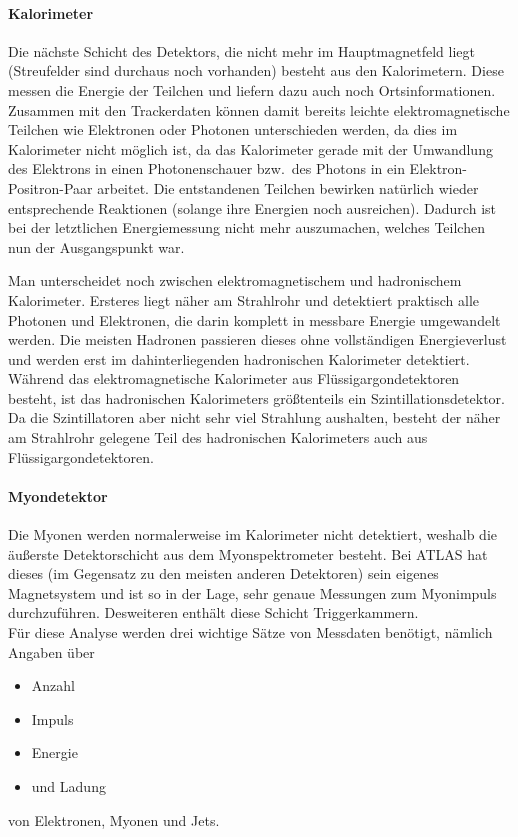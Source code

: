 \paragraph{Kalorimeter}
\label{cha:kalorimeter}
Die nächste Schicht des Detektors, die nicht mehr im Hauptmagnetfeld liegt
(Streufelder sind durchaus noch vorhanden) besteht aus den Kalorimetern. Diese
messen die Energie der Teilchen und liefern dazu auch noch Ortsinformationen.
Zusammen mit den Trackerdaten können damit bereits leichte elektromagnetische
Teilchen wie Elektronen oder Photonen unterschieden werden, da dies im
Kalorimeter nicht möglich ist, da das Kalorimeter gerade mit der Umwandlung des
Elektrons in einen Photonenschauer bzw.\ des Photons in ein
Elektron-Positron-Paar arbeitet. Die entstandenen Teilchen bewirken natürlich
wieder entsprechende Reaktionen (solange ihre Energien noch ausreichen). Dadurch
ist bei der letztlichen Energiemessung nicht mehr auszumachen, welches Teilchen
nun der Ausgangspunkt war.

Man unterscheidet noch zwischen elektromagnetischem und hadronischem
Kalorimeter. Ersteres liegt näher am Strahlrohr und detektiert praktisch alle
Photonen und Elektronen, die darin komplett in messbare Energie umgewandelt
werden. Die meisten Hadronen passieren dieses ohne vollständigen Energieverlust
und werden erst im dahinterliegenden hadronischen Kalorimeter detektiert.
Während das elektromagnetische Kalorimeter aus Flüssigargondetektoren besteht,
ist das hadronischen Kalorimeters größtenteils ein Szintillationsdetektor. Da
die Szintillatoren aber nicht sehr viel Strahlung aushalten, besteht der näher
am Strahlrohr gelegene Teil des hadronischen Kalorimeters auch aus
Flüssigargondetektoren.

\paragraph{Myondetektor}
Die Myonen werden normalerweise im Kalorimeter nicht detektiert, weshalb die
äußerste Detektorschicht aus dem Myonspektrometer besteht. Bei ATLAS hat dieses (im
Gegensatz zu den meisten anderen Detektoren) sein eigenes Magnetsystem und ist
so in der Lage, sehr genaue Messungen zum Myonimpuls durchzuführen. Desweiteren
enthält diese Schicht Triggerkammern.
\\

Für diese Analyse werden drei wichtige Sätze von Messdaten benötigt, nämlich
Angaben über 
\begin{itemize}
  \item Anzahl
  \item Impuls
  \item Energie
  \item und Ladung
\end{itemize} von Elektronen, Myonen und Jets.

